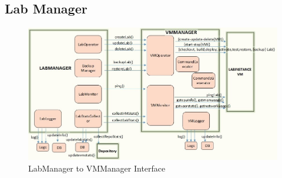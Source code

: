 \documentclass[11pt]{article}
\begin{document}
\subsection{Lab Manager}
\label{sec-4.1}


   \begin{figure}[H]
\centering
\includegraphics[width=16cm]{labmgr-vmmgr.jpg}
\caption{LabManager to VMManager Interface}
\end{figure}   
\end{document}
